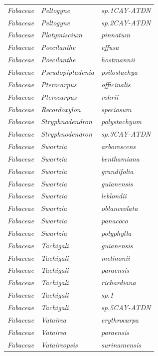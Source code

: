 \documentclass[fleqn,10pt]{ArtEcoFoG} %
\begin{document}
\begin{table}[t]
\begin{tabular}{lll}
\em{Fabaceae} & \em{Peltogyne} & \em{sp.1CAY-ATDN}\\
\addlinespace
\em{Fabaceae} & \em{Peltogyne} & \em{sp.2CAY-ATDN}\\
\em{Fabaceae} & \em{Platymiscium} & \em{pinnatum}\\
\em{Fabaceae} & \em{Poecilanthe} & \em{effusa}\\
\em{Fabaceae} & \em{Poecilanthe} & \em{hostmannii}\\
\em{Fabaceae} & \em{Pseudopiptadenia} & \em{psilostachya}\\
\addlinespace
\em{Fabaceae} & \em{Pterocarpus} & \em{officinalis}\\
\em{Fabaceae} & \em{Pterocarpus} & \em{rohrii}\\
\em{Fabaceae} & \em{Recordoxylon} & \em{speciosum}\\
\em{Fabaceae} & \em{Stryphnodendron} & \em{polystachyum}\\
\em{Fabaceae} & \em{Stryphnodendron} & \em{sp.3CAY-ATDN}\\
\addlinespace
\em{Fabaceae} & \em{Swartzia} & \em{arborescens}\\
\em{Fabaceae} & \em{Swartzia} & \em{benthamiana}\\
\em{Fabaceae} & \em{Swartzia} & \em{grandifolia}\\
\em{Fabaceae} & \em{Swartzia} & \em{guianensis}\\
\em{Fabaceae} & \em{Swartzia} & \em{leblondii}\\
\addlinespace
\em{Fabaceae} & \em{Swartzia} & \em{oblanceolata}\\
\em{Fabaceae} & \em{Swartzia} & \em{panacoco}\\
\em{Fabaceae} & \em{Swartzia} & \em{polyphylla}\\
\em{Fabaceae} & \em{Tachigali} & \em{guianensis}\\
\em{Fabaceae} & \em{Tachigali} & \em{melinonii}\\
\addlinespace
\em{Fabaceae} & \em{Tachigali} & \em{paraensis}\\
\em{Fabaceae} & \em{Tachigali} & \em{richardiana}\\
\em{Fabaceae} & \em{Tachigali} & \em{sp.1}\\
\em{Fabaceae} & \em{Tachigali} & \em{sp.5CAY-ATDN}\\
\em{Fabaceae} & \em{Vatairea} & \em{erythrocarpa}\\
\addlinespace
\em{Fabaceae} & \em{Vatairea} & \em{paraensis}\\
\em{Fabaceae} & \em{Vataireopsis} & \em{surinamensis}\\

\end{tabular}
\end{table}
\end{document}
